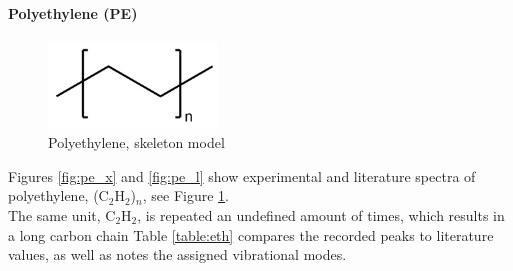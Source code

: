     \newpage

    \paragraph{Polyethylene (PE)}

    \begin{figure} %
        \centering
        \vspace{-20pt}
        \includegraphics[width=0.4\textwidth]{images/raman_spectra/pe_i.png}
        \caption{Polyethylene, skeleton model}
        \label{fig:pe_i}
    \end{figure}


    Figures \ref{fig:pe_x} and \ref{fig:pe_l} show experimental and literature spectra of polyethylene, (C\(_2\)H\(_2\))\(_n\), see Figure \ref{fig:pe_i}. \\
    The same unit, C\(_2\)H\(_2\), is repeated an undefined amount of times, which results in a long carbon chain Table \ref{table:eth} compares the recorded peaks to literature values, as well as notes the assigned vibrational modes. 

